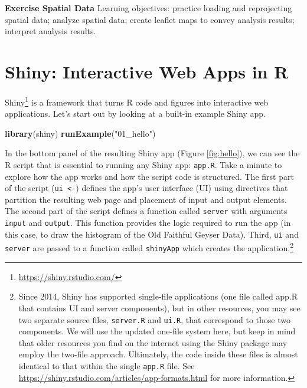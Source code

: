 \documentclass[
]{krantz}
\makeatletter
\newenvironment{Shaded}{\begin{snugshade}}{\end{snugshade}}
\newcommand{\KeywordTok}[1]{\textcolor[rgb]{0.27,0.27,0.27}{\textbf{#1}}}
\newcommand{\NormalTok}[1]{#1}
\newcommand{\StringTok}[1]{\textcolor[rgb]{0.5,0.5,0.5}{#1}}
\renewcommand{\href}[2]{#2\footnote{\url{#1}}}
\newenvironment{kframe}{%
\medskip{}
\setlength{\fboxsep}{.8em}
 \def\at@end@of@kframe{}%
 \ifinner\ifhmode%
  \def\at@end@of@kframe{\end{minipage}}%
  \begin{minipage}{\columnwidth}%
 \fi\fi%
 \def\FrameCommand##1{\hskip\@totalleftmargin \hskip-\fboxsep
 \colorbox{shadecolor}{##1}\hskip-\fboxsep
     \hskip-\linewidth \hskip-\@totalleftmargin \hskip\columnwidth}%
 \MakeFramed {\advance\hsize-\width
   \@totalleftmargin\z@ \linewidth\hsize
   \@setminipage}}%
 {\par\unskip\endMakeFramed%
 \at@end@of@kframe}
\renewenvironment{Shaded}{\begin{kframe}}{\end{kframe}}
\makeatother
\begin{document}
\textbf{Exercise Spatial Data} Learning objectives: practice loading and reprojecting spatial data; analyze spatial data; create leaflet maps to convey analysis results; interpret analysis results.

\hypertarget{shiny-interactive-web-apps-in-r}{%
\chapter{Shiny: Interactive Web Apps in R}\label{shiny-interactive-web-apps-in-r}}

\href{https://shiny.rstudio.com/}{Shiny} is a framework that turns R code and figures into interactive web applications. Let's start out by looking at a built-in example Shiny app.

\begin{Shaded}
\begin{Highlighting}[]
\KeywordTok{library}\NormalTok{(shiny)}
\KeywordTok{runExample}\NormalTok{(}\StringTok{"01\_hello"}\NormalTok{)}
\end{Highlighting}
\end{Shaded}

In the bottom panel of the resulting Shiny app (Figure \ref{fig:hello}), we can see the R script that is essential to running any Shiny app: \texttt{app.R}. Take a minute to explore how the app works and how the script code is structured. The first part of the script (\texttt{ui\ \textless{}-}) defines the app's user interface (UI) using directives that partition the resulting web page and placement of input and output elements. The second part of the script defines a function called \texttt{server} with arguments \texttt{input} and \texttt{output}. This function provides the logic required to run the app (in this case, to draw the histogram of the Old Faithful Geyser Data). Third, \texttt{ui} and \texttt{server} are passed to a function called \texttt{shinyApp} which creates the application.\footnote{Since 2014, Shiny has supported single-file applications (one file called app.R that contains UI and server components), but in other resources, you may see two separate source files, \texttt{server.R} and \texttt{ui.R}, that correspond to those two components. We will use the updated one-file system here, but keep in mind that older resources you find on the internet using the Shiny package may employ the two-file approach. Ultimately, the code inside these files is almost identical to that within the single \texttt{app.R} file. See \url{https://shiny.rstudio.com/articles/app-formats.html} for more information.}
\end{document}
